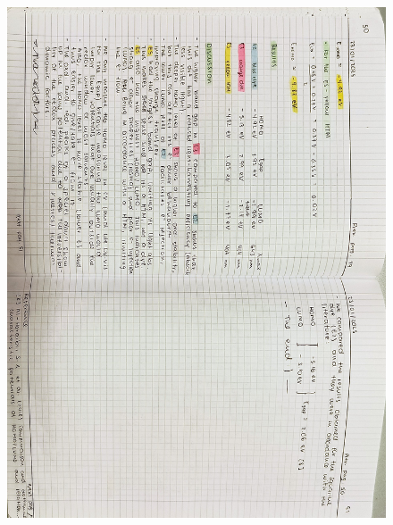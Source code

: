 \begin{figure}[H]
	\centering
	\includegraphics[width=0.6\linewidth, angle=90]{../images/compressed/IMG20250123173139.jpg}
\end{figure}


